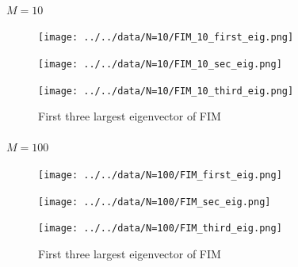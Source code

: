 \documentclass[
]{article}
\makeatletter
\let\oldparagraph\paragraph
\renewcommand{\paragraph}{
    \@ifstar
      \xxxParagraphStar
      \xxxParagraphNoStar
  }
\newcommand{\xxxParagraphStar}[1]{\oldparagraph*{#1}\mbox{}}
\newcommand{\xxxParagraphNoStar}[1]{\oldparagraph{#1}\mbox{}}
\makeatother
\begin{document}
\paragraph{\texorpdfstring{\(M = 10\)}{M = 10}}\label{m-10}

\begin{figure}

\begin{minipage}{0.33\linewidth}

\texttt{[image: ../../data/N=10/FIM\_10\_first\_eig.png]}

\end{minipage}%
%
\begin{minipage}{0.33\linewidth}

\texttt{[image: ../../data/N=10/FIM\_10\_sec\_eig.png]}

\end{minipage}%
%
\begin{minipage}{0.33\linewidth}

\texttt{[image: ../../data/N=10/FIM\_10\_third\_eig.png]}

\end{minipage}%

\caption{\label{fig-eig10}First three largest eigenvector of FIM}

\end{figure}%

\paragraph{\texorpdfstring{\(M = 100\)}{M = 100}}\label{m-100}

\begin{figure}

\begin{minipage}{0.33\linewidth}

\texttt{[image: ../../data/N=100/FIM\_first\_eig.png]}

\end{minipage}%
%
\begin{minipage}{0.33\linewidth}

\texttt{[image: ../../data/N=100/FIM\_sec\_eig.png]}

\end{minipage}%
%
\begin{minipage}{0.33\linewidth}

\texttt{[image: ../../data/N=100/FIM\_third\_eig.png]}

\end{minipage}%

\caption{\label{fig-eig100}First three largest eigenvector of FIM}

\end{figure}%
\end{document}
